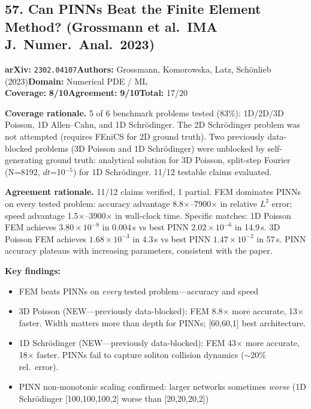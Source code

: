 \documentclass[11pt]{article}
\newcommand{\scorebadge}[2]{\textbf{#1:} \textbf{#2/10}}
\begin{document}
\subsection{57. Can PINNs Beat the Finite Element Method? (Grossmann et al.\ IMA J.~Numer.~Anal.\ 2023)}
\textbf{arXiv:} \texttt{2302.04107}\quad\textbf{Authors:} Grossmann, Komorowska, Latz, Sch\"onlieb (2023)\quad\textbf{Domain:} Numerical PDE / ML\\
\scorebadge{Coverage}{8}\quad\scorebadge{Agreement}{9}\quad\textbf{Total:} 17/20\par\smallskip
\noindent\textbf{Coverage rationale.} 5 of 6 benchmark problems tested (83\%): 1D/2D/3D Poisson, 1D Allen--Cahn, and 1D Schr\"odinger. The 2D Schr\"odinger problem was not attempted (requires FEniCS for 2D ground truth). Two previously data-blocked problems (3D Poisson and 1D Schr\"odinger) were unblocked by self-generating ground truth: analytical solution for 3D Poisson, split-step Fourier (N=8192, $dt$=10$^{-5}$) for 1D Schr\"odinger. 11/12 testable claims evaluated.\par
\noindent\textbf{Agreement rationale.} 11/12 claims verified, 1 partial. FEM dominates PINNs on every tested problem: accuracy advantage 8.8$\times$--7900$\times$ in relative $L^2$ error; speed advantage 1.5$\times$--3900$\times$ in wall-clock time. Specific matches: 1D Poisson FEM achieves $3.80 \times 10^{-8}$ in 0.004\,s vs best PINN $2.02 \times 10^{-6}$ in 14.9\,s. 3D Poisson FEM achieves $1.68 \times 10^{-3}$ in 4.3\,s vs best PINN $1.47 \times 10^{-2}$ in 57\,s. PINN accuracy plateaus with increasing parameters, consistent with the paper.\par\smallskip
\noindent\textbf{Key findings:}
\begin{itemize}[leftmargin=1.4em,itemsep=0.2em,topsep=0.2em]
\item FEM beats PINNs on \emph{every} tested problem---accuracy and speed
\item 3D Poisson (NEW---previously data-blocked): FEM 8.8$\times$ more accurate, 13$\times$ faster. Width matters more than depth for PINNs; [60,60,1] best architecture.
\item 1D Schr\"odinger (NEW---previously data-blocked): FEM 43$\times$ more accurate, 18$\times$ faster. PINNs fail to capture soliton collision dynamics ($\sim$20\% rel.~error).
\item PINN non-monotonic scaling confirmed: larger networks sometimes \emph{worse} (1D Schr\"odinger [100,100,100,2] worse than [20,20,20,2])
\end{itemize}
\end{document}
